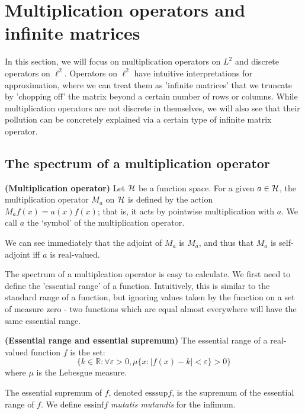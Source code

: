 \documentclass[../main.tex]{subfiles}
\begin{document}
\section{Multiplication operators and infinite matrices}
In this section, we will focus on multiplication operators on $L^2$ and
discrete operators on $\ell^2$. Operators on $\ell^2$ have intuitive
interpretations for approximation, where we can treat them as 'infinite
matrices' that we truncate by 'chopping off' the matrix beyond a certain number
of rows or columns. While multiplication operators are not discrete in
themselves, we will also see that their pollution can be concretely explained
via a certain type of infinite matrix operator.

\subsection{The spectrum of a multiplication operator}
\begin{definition}{\textbf{(Multiplication operator)}}
Let $\mathcal{H}$ be a function space. For a given $a \in \mathcal{H}$, the
multiplication operator $M_a$ on $\mathcal{H}$ is defined by the action
$M_af(x) = a(x)f(x)$; that is, it acts by pointwise multiplication with
$a$. We call $a$ the `symbol' of the multiplication operator.
\end{definition}

We can see immediately that the adjoint of $M_a$ is $M_{\overline{a}}$, and thus
that $M_a$ is self-adjoint iff $a$ is real-valued.

The spectrum of a multiplcation operator is easy to calculate. We first
need to define the 'essential range' of a function. Intuitively, this is
similar to the standard range of a function, but ignoring values taken by
the function on a set of measure zero - two functions which are equal
almost everywhere will have the same essential range.

\begin{definition}{\textbf{(Essential range and essential supremum)}}
\label{defn:essential-range}
The essential range of a real-valued function $f$ is the set:
 $$\{k \in \mathbb{R} : \forall \varepsilon > 0, \mu\{x : |f(x) - k| < \varepsilon\} > 0\}$$
where $\mu$ is the Lebesgue measure.
  
The essential supremum of $f$, denoted $\mathrm{esssup}f$, is the supremum of
the essential range of $f$. We define $\mathrm{essinf}f$ \emph{mutatis
mutandis} for the infimum.
\end{definition}
\end{document}
